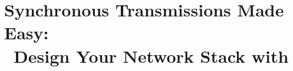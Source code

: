 
\chapter[Synchronous Transmissions Made Easy with \baloo]{Synchronous Transmissions Made Easy:\\~Design Your Network Stack with \baloo}
\label{ch:baloo}

\renewcommand{\ChapPath}{30_Baloo}
\renewcommand{\PathTab}{\ChapPath/Tables}












\begin{subappendices}
\newpage

\end{subappendices}

